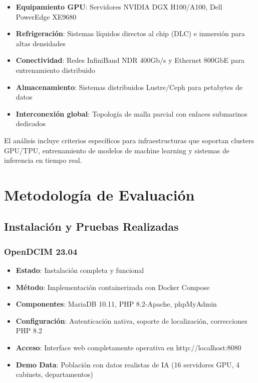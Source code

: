 \documentclass[12pt,a4paper]{article}
\begin{document}
\begin{itemize}
    \item \textbf{Equipamiento GPU}: Servidores NVIDIA DGX H100/A100, Dell PowerEdge XE9680
    \item \textbf{Refrigeración}: Sistemas líquidos directos al chip (DLC) e inmersión para altas densidades
    \item \textbf{Conectividad}: Redes InfiniBand NDR 400Gb/s y Ethernet 800GbE para entrenamiento distribuido
    \item \textbf{Almacenamiento}: Sistemas distribuidos Lustre/Ceph para petabytes de datos
    \item \textbf{Interconexión global}: Topología de malla parcial con enlaces submarinos dedicados
\end{itemize}

El análisis incluye criterios específicos para infraestructuras que soportan clusters GPU/TPU, entrenamiento de modelos de machine learning y sistemas de inferencia en tiempo real.

\section{Metodología de Evaluación}

\subsection{Instalación y Pruebas Realizadas}

\subsubsection{OpenDCIM 23.04}
\begin{itemize}
    \item \textbf{Estado}: Instalación completa y funcional
    \item \textbf{Método}: Implementación containerizada con Docker Compose
    \item \textbf{Componentes}: MariaDB 10.11, PHP 8.2-Apache, phpMyAdmin
    \item \textbf{Configuración}: Autenticación nativa, soporte de localización, correcciones PHP 8.2
    \item \textbf{Acceso}: Interface web completamente operativa en http://localhost:8080
    \item \textbf{Demo Data}: Población con datos realistas de IA (16 servidores GPU, 4 cabinets, departamentos)
\end{itemize}
\end{document}
